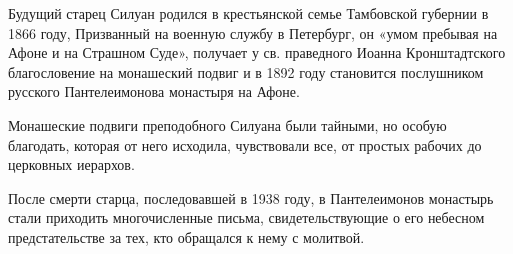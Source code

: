 \documentclass[12pt,a4paper]{article}
\begin{document}
\begin{window}
Будущий старец Силуан родился в крестьянской семье Тамбовской губернии в 1866 году, Призванный на военную службу в Петербург, он «умом пребывая на Афоне и на Страшном Суде», получает у св. праведного Иоанна Кронштадтского благословение на монашеский подвиг и в 1892 году становится послушником русского Пантелеимонова монастыря на Афоне.

\par Монашеские подвиги преподобного Силуана были тайными, но особую благодать, которая от него исходила, чувствовали все, от простых рабочих до церковных иерархов. 






После смерти старца, последовавшей в 1938 году, в Пантелеимонов монастырь стали приходить многочисленные письма, свидетельствующие о его небесном предстательстве за тех, кто обращался к нему с молитвой.
\end{window}

\end{document}
